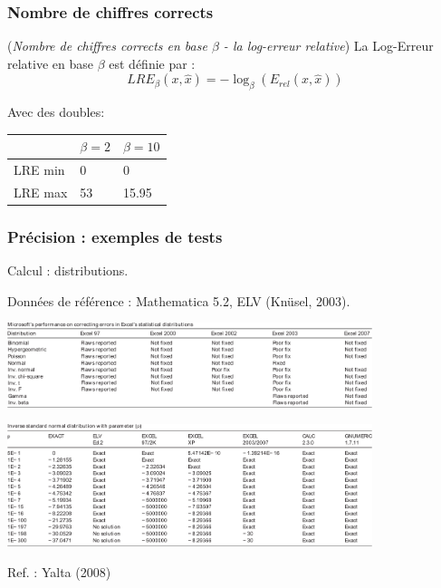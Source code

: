 \documentclass{beamer}
\begin{document}

\begin{frame}
\frametitle{Nombre de chiffres corrects}

\begin{definition}
(\emph{Nombre de chiffres corrects en base $\beta$ - la log-erreur relative})
La Log-Erreur relative en base $\beta$ est définie par :
$$
LRE_\beta(x,\hat{x})
=-\log_{\beta}(E_{rel}(x,\hat{x}))
$$
\end{definition}

Avec des doubles:

\begin{center}
\begin{tabular}{l|ll}
        & $\beta=2$ & $\beta=10$ \\
\hline
LRE min & 0     & 0      \\
LRE max & 53    & 15.95
\end{tabular}
\end{center}

\end{frame}


\begin{frame}
\frametitle{Précision : exemples de tests}

Calcul : distributions.

Données de référence : Mathematica 5.2, ELV (Knüsel, 2003).

\begin{center}
\includegraphics[width=0.8\textwidth]{Yalta-2008-excel}
\end{center}

\begin{center}
\includegraphics[width=0.8\textwidth]{Yalta-2008-invnorm}
\end{center}

Ref. : Yalta (2008)

\end{frame}
\end{document}
